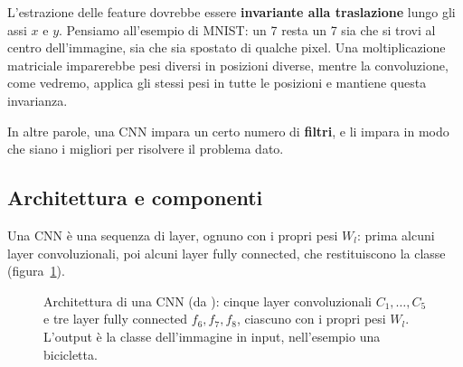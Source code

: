 \begin{osservazione}
L'estrazione delle feature dovrebbe essere \textbf{invariante alla traslazione} lungo gli assi $x$ e $y$. Pensiamo all'esempio di MNIST: un 7 resta un 7 sia che si trovi al centro dell'immagine, sia che sia spostato di qualche pixel. Una moltiplicazione matriciale imparerebbe pesi diversi in posizioni diverse, mentre la convoluzione, come vedremo, applica gli stessi pesi in tutte le posizioni e mantiene questa invarianza.
\end{osservazione}

In altre parole, una CNN impara un certo numero di \textbf{filtri}, e li impara in modo che siano i migliori per risolvere il problema dato.

\subsection{Architettura e componenti}
Una CNN è una sequenza di layer, ognuno con i propri pesi $W_l$: prima alcuni layer convoluzionali, poi alcuni layer fully connected, che restituiscono la classe (figura~\ref{fig:cnn-arch}).

\begin{figure}[htbp]
\centering
{}
\caption{Architettura di una CNN (da \cite{Krizhevsky2012}): cinque layer convoluzionali $C_1, \dots, C_5$ e tre layer fully connected $f_6, f_7, f_8$, ciascuno con i propri pesi $W_l$. L'output è la classe dell'immagine in input, nell'esempio una bicicletta.}
\label{fig:cnn-arch}
\end{figure}

